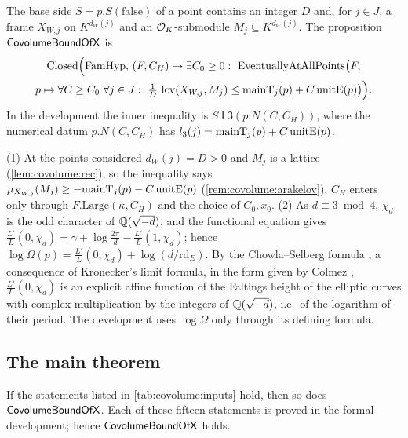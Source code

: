 \begin{definition}\label{def:covolX}
The base side $S=p.S(\mathrm{false})$ of a point contains an integer $D$ and, for $j\in J$, a frame
$X_{W,j}$ on $K^{d_W(j)}$ and an $\mathcal{O}_K$-submodule $M_j\subseteq K^{d_W(j)}$. The proposition
$\mathsf{CovolumeBoundOfX}$ is
\begin{multline*}
\mathrm{Closed}\Bigl(\mathrm{FamHyp},\,(F,C_H)\mapsto\exists C_0\ge0:\ \mathrm{EventuallyAtAllPoints}\bigl(F,\\
p\mapsto\forall C\ge C_0\ \forall j\in J:\ \tfrac1D\,\covolumelcv(X_{W,j},M_j)\le
\covolumemainT_j(p)+C\,\covolumeunitE(p)\bigr)\Bigr).
\end{multline*}
In the development the inner inequality is $S.\mathsf{L3}(p.N(C,C_H))$, where the numerical datum
$p.N(C,C_H)$ has $l_3(j)=\mathrm{mainT}_j(p)+C\,\mathrm{unitE}(p)$.
\end{definition}

\begin{remark}\label{rem:covolume:omega}
(1) At the points considered $d_W(j)=D>0$ and $M_j$ is a lattice (\cref{lem:covolume:rec}), so the
inequality says $\mu_{X_{W,j}}(M_j)\ge-\mathrm{mainT}_j(p)-C\,\mathrm{unitE}(p)$
(\cref{rem:covolume:arakelov}). $C_H$ enters only through $F.\mathrm{Large}(\kappa,C_H)$ and the choice of
$C_0,x_0$. (2) As $d\equiv3\bmod4$, $\chi_d$ is the odd character of $\mathbb{Q}(\sqrt{-d})$, and the functional
equation gives $\frac{L'}{L}(0,\chi_d)=\gamma+\log\frac{2\pi}{d}-\frac{L'}{L}(1,\chi_d)$; hence
$\log\Omega(p)=\frac{L'}{L}(0,\chi_d)+\log(d/\mathrm{rd}_E)$. By the Chowla--Selberg formula
\cite{ChowlaSelberg1967}, a consequence of Kronecker's limit formula, in the form given by Colmez
\cite{Colmez1993}, $\frac{L'}{L}(0,\chi_d)$ is an
explicit affine function of the Faltings height of the elliptic curves with complex multiplication by
the integers of $\mathbb{Q}(\sqrt{-d})$, i.e.\ of the logarithm of their period. The development uses
$\log\Omega$ only through its defining formula.
\end{remark}

\subsection{The main theorem}\label{sec:covolume:main}

\begin{theorem}\Fmark\label{thm:covol}
If the statements listed in \cref{tab:covolume:inputs} hold, then so does $\mathsf{CovolumeBoundOfX}$.
Each of these fifteen statements is proved in the formal development; hence
$\mathsf{CovolumeBoundOfX}$ holds.
\end{theorem}

